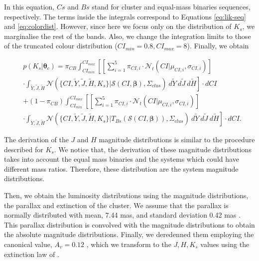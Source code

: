 In this equation, $Cs$ and $Bs$ stand for cluster and equal-mass binaries sequences, respectively. The terms inside the integrals correspond to Equations \ref{eq:lik-seq} and \ref{eq:colordist}. However, since here we focus only on the distribution of $K_s$, we marginalise the rest of the bands. Also, we change the integration limits to those of the truncated colour distribution ($CI_{min}=0.8, CI_{max}=8$). Finally, we obtain

\begin{align}
&p(K_s | \boldsymbol{\theta}_c)  =   \pi_{CB} \int_{CI_{min}}^{CI_{max}}\left[ \left[\sum_{i=1}^5 \pi_{CI,i} \cdot \mathcal{N}_t(CI| \mu_{CI,i},\sigma_{CI,i})\right]\right. \nonumber \\
&\cdot  \left.\int_{\tilde{Y},\tilde{J},\tilde{H}}\mathcal{N}(\{CI,\tilde{Y},\tilde{J},\tilde{H},K_s\}|\boldsymbol{\mathcal{S}}(CI, \boldsymbol{\beta}),\Sigma_{clus})~d\tilde{Y}~d\tilde{J}~d\tilde{H}\right] \cdot dCI \nonumber \\
& + (1-\pi_{CB}) \int_{CI_{min}}^{CI_{max}}\left[\left[\sum_{i=1}^5 \pi_{CI,i} \cdot \mathcal{N}_t(CI| \mu_{CI,i},\sigma_{CI,i})\right]\right.\nonumber\\
&\cdot \left. \int_{\tilde{Y},\tilde{J},\tilde{H}}\mathcal{N}(\{CI,\tilde{Y},\tilde{J},\tilde{H},K_s\}|T_{Bs}(\boldsymbol{\mathcal{S}}(CI, \boldsymbol{\beta})),\Sigma_{clus})~d\tilde{Y}~d\tilde{J}~d\tilde{H}\right]\cdot dCI. \nonumber 
\end{align}

The derivation of the $J$ and $H$ magnitude distributions is similar to the procedure described for $K_s$. We notice that, the derivation of these magnitude distributions takes into account the equal mass binaries and the systems which could have different mass ratios. Therefore, these distribution are the system magnitude distributions. 

Then, we obtain the luminosity distributions using the magnitude distributions, the parallax and extinction of the cluster. We assume that the parallax is normally distributed with mean, 7.44 mas, and standard deviation 0.42 mas \citep{Galli2017}. This parallax distribution is convolved with the magnitude distributions to obtain the absolute magnitude distributions. Finally, we deredenned them employing the canonical value, $A_v=0.12$ \citep{Guthrie1987}, which we transform to the $J,H,K_s$ values using the extinction law of \citet{Cardelli1989}.

